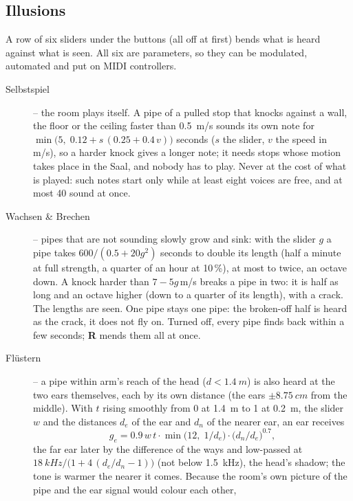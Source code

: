 \documentclass[11pt,a4paper,parskip=half,DIV=11,toc=bibliography]{scrartcl}
\begin{document}
\subsection{Illusions}
\label{sec:illusions}
A row of six sliders under the buttons (all off at first) bends what is heard against what is seen. All six are parameters, so they can be modulated,
automated and put on MIDI controllers.
\begin{description}
  \item[Selbstspiel] -- the room plays itself. A pipe of a pulled stop that knocks against a wall, the floor or the ceiling faster than \SI{0.5}{m/s} sounds
        its own note for $\min\bigl(5,\;0.12+s\,(0.25+0.4\,v)\bigr)$ seconds ($s$ the slider, $v$ the speed in m/s), so a harder knock gives a longer note;
        it needs stops whose motion takes place in the Saal, and nobody has to play. Never at the cost of what is played: such notes start only while
        at least eight voices are free, and at most 40 sound at once.
  \item[Wachsen \& Brechen] -- pipes that are not sounding slowly grow and sink: with the slider $g$ a pipe takes $600/(0.5+20g^2)$ seconds to
        double its length (half a minute at full strength, a quarter of an hour at 10\,\%), at most to twice, an octave down. A knock harder than
        $7-5g$\,m/s breaks a pipe in two: it is half as long and an octave higher (down to a quarter of its length), with a crack. The lengths are
        seen. One pipe stays one pipe: the broken-off half is heard as the crack, it does not fly on. Turned off, every pipe finds back within a few
        seconds; \textbf{R} mends them all at once.
  \item[Flüstern] -- a pipe within arm's reach of the head ($d<\SI{1.4}{m}$) is also heard at the two ears themselves, each by its own distance
        (the ears $\pm\SI{8.75}{cm}$ from the middle). With $t$ rising smoothly from 0 at \SI{1.4}{m} to 1 at \SI{0.2}{m}, the slider $w$ and the
        distances $d_e$ of the ear and $d_n$ of the nearer ear, an ear receives
        \begin{equation}
          g_e = 0.9\,w\,t\cdot\min\bigl(12,\;1/d_e\bigr)\cdot\bigl(d_n/d_e\bigr)^{0.7},
        \end{equation}
        the far ear later by the difference of the ways and low-passed at $\SI{18}{kHz}/\bigl(1+4\,(d_e/d_n-1)\bigr)$ (not below \SI{1.5}{kHz}), the
        head's shadow; the tone is warmer the nearer it comes. Because the room's own picture of the pipe and the ear signal would colour each other,

\end{description}
\end{document}
